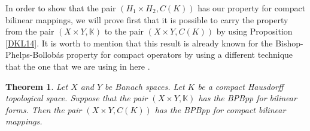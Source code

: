 \documentclass[12pt,a4paper]{amsart}
\newtheorem{theorem}{Theorem}[section]
\theoremstyle{definition}
\numberwithin{equation}{section}
\newcommand{\K}{\mathbb{K}} %
\def\K{{\mathbb K}}
\begin{document}
In order to show that the pair $(H_1 \times H_2, C(K))$ has our property for compact bilinear mappings, we will prove first that it is possible to carry the property from the pair $(X \times Y, \K)$ to the pair $(X \times Y, C(K))$ by using Proposition \ref{DKL14}. It is worth to mention that this result is already known for the Bishop-Phelps-Bollob\'as property for compact operators by using a different technique that the one that we are using in here \cite[Theorem 3.15(c)]{DGMM}. 



\begin{theorem} Let $X$ and $Y$ be Banach spaces. Let $K$ be a compact Hausdorff topological space. Suppose that the pair $(X \times Y, \K)$ has the BPBpp for bilinear forms. Then the pair $(X \times Y, C(K))$ has the BPBpp for compact bilinear mappings.
	\label{DKL15}
\end{theorem}
\end{document}
